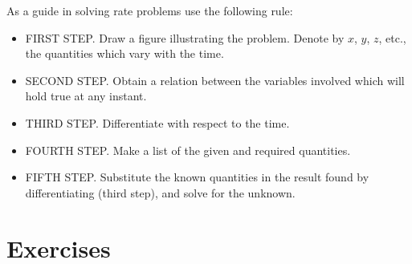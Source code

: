 As a guide in solving rate problems use the following rule:

\begin{itemize}
\item
FIRST STEP. Draw a figure illustrating the problem. 
Denote by $x$, $y$, $z$, etc., the quantities which vary with the time.

\item
SECOND STEP. Obtain a relation between the variables 
involved which will hold true at any instant.

\item
THIRD STEP. Differentiate with respect to the time.

\item
FOURTH STEP. Make a list of the given and required quantities.

\item
FIFTH STEP. Substitute the known quantities in the result 
found by differentiating (third step), and solve for the unknown.
\end{itemize}



\section{Exercises}


